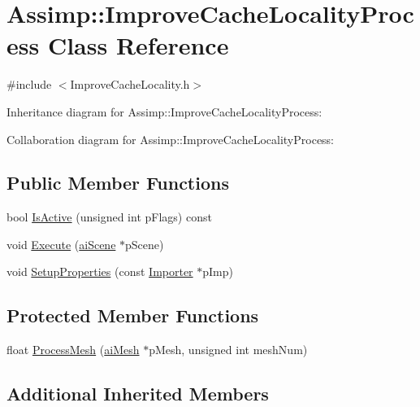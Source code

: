 \hypertarget{class_assimp_1_1_improve_cache_locality_process}{\section{Assimp\+:\+:Improve\+Cache\+Locality\+Process Class Reference}
\label{class_assimp_1_1_improve_cache_locality_process}
}


{\ttfamily \#include $<$Improve\+Cache\+Locality.\+h$>$}



Inheritance diagram for Assimp\+:\+:Improve\+Cache\+Locality\+Process\+:


Collaboration diagram for Assimp\+:\+:Improve\+Cache\+Locality\+Process\+:
\subsection*{Public Member Functions}
\begin{DoxyCompactItemize}
\item 
bool \hyperlink{class_assimp_1_1_improve_cache_locality_process_ad9bdc67862de1867269690f1caec2e2e}{Is\+Active} (unsigned int p\+Flags) const 
\item 
void \hyperlink{class_assimp_1_1_improve_cache_locality_process_a00b375c4959981aa46902b4bdabf2104}{Execute} (\hyperlink{structai_scene}{ai\+Scene} $\ast$p\+Scene)
\item 
void \hyperlink{class_assimp_1_1_improve_cache_locality_process_a70a4e7c1615ab706c4b689658e98fd0a}{Setup\+Properties} (const \hyperlink{class_assimp_1_1_importer}{Importer} $\ast$p\+Imp)
\end{DoxyCompactItemize}
\subsection*{Protected Member Functions}
\begin{DoxyCompactItemize}
\item 
float \hyperlink{class_assimp_1_1_improve_cache_locality_process_a78286fab33f4e7ef6ab2a42b7c76e9cf}{Process\+Mesh} (\hyperlink{structai_mesh}{ai\+Mesh} $\ast$p\+Mesh, unsigned int mesh\+Num)
\end{DoxyCompactItemize}
\subsection*{Additional Inherited Members}


